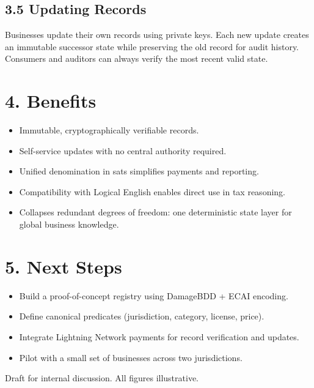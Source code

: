 \documentclass[11pt]{article}
\begin{document}
\subsection*{3.5 Updating Records}
Businesses update their own records using private keys. Each new update creates an immutable successor state while preserving the old record for audit history. Consumers and auditors can always verify the most recent valid state.

\section*{4. Benefits}
\begin{itemize}
  \item Immutable, cryptographically verifiable records.
  \item Self-service updates with no central authority required.
  \item Unified denomination in sats simplifies payments and reporting.
  \item Compatibility with Logical English enables direct use in tax reasoning.
  \item Collapses redundant degrees of freedom: one deterministic state layer for global business knowledge.
\end{itemize}

\section*{5. Next Steps}
\begin{itemize}
  \item Build a proof-of-concept registry using DamageBDD + ECAI encoding.
  \item Define canonical predicates (jurisdiction, category, license, price).
  \item Integrate Lightning Network payments for record verification and updates.
  \item Pilot with a small set of businesses across two jurisdictions.
\end{itemize}

\vfill
\noindent\footnotesize Draft for internal discussion. All figures illustrative.
\end{document}
